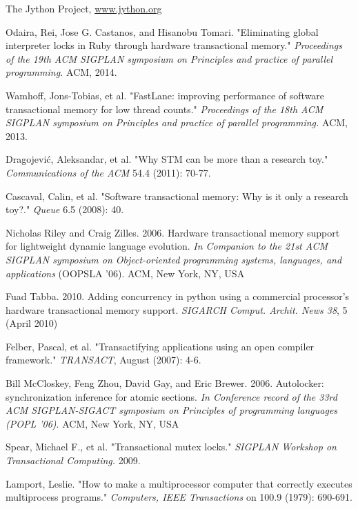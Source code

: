 \documentclass{sigplanconf}
\begin{document}
\begin{thebibliography}{}
\softraggedright

  The Jython Project, \url{www.jython.org}

  Odaira, Rei, Jose G. Castanos, and Hisanobu Tomari.  "Eliminating
  global interpreter locks in Ruby through hardware transactional
  memory."  \emph{Proceedings of the 19th ACM SIGPLAN symposium on
    Principles and practice of parallel programming.} ACM, 2014.

  Wamhoff, Jons-Tobias, et al. "FastLane: improving performance of
  software transactional memory for low thread counts."
  \emph{Proceedings of the 18th ACM SIGPLAN symposium on Principles
    and practice of parallel programming.} ACM, 2013.

  Dragojević, Aleksandar, et al. "Why STM can be more than a research
  toy." \emph{Communications of the ACM} 54.4 (2011): 70-77.

  Cascaval, Calin, et al. "Software transactional memory: Why is it
  only a research toy?." \emph{Queue} 6.5 (2008): 40.

  Nicholas Riley and Craig Zilles. 2006. Hardware transactional memory
  support for lightweight dynamic language evolution. \emph{In
    Companion to the 21st ACM SIGPLAN symposium on Object-oriented
    programming systems, languages, and applications} (OOPSLA
  '06). ACM, New York, NY, USA

  Fuad Tabba. 2010. Adding concurrency in python using a commercial
  processor's hardware transactional memory support. \emph{SIGARCH
  Comput. Archit. News 38}, 5 (April 2010)

  Felber, Pascal, et al. "Transactifying applications using an open
  compiler framework." \emph{TRANSACT}, August (2007): 4-6.

  Bill McCloskey, Feng Zhou, David Gay, and Eric
  Brewer. 2006. Autolocker: synchronization inference for atomic
  sections. \emph{In Conference record of the 33rd ACM SIGPLAN-SIGACT
  symposium on Principles of programming languages (POPL '06)}. ACM,
  New York, NY, USA

  Spear, Michael F., et al. "Transactional mutex locks." \emph{SIGPLAN
    Workshop on Transactional Computing.} 2009.

  Lamport, Leslie. "How to make a multiprocessor computer that
  correctly executes multiprocess programs." \emph{Computers, IEEE
    Transactions} on 100.9 (1979): 690-691.


\end{thebibliography}
\end{document}
